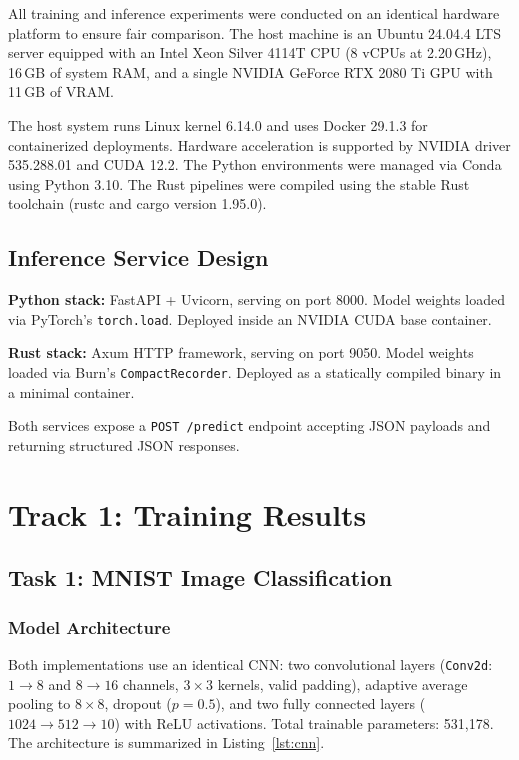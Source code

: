 \documentclass{ieeeaccess}
\begin{document}
All training and inference experiments were conducted on an identical hardware platform to ensure fair comparison. The host machine is an Ubuntu 24.04.4 LTS server equipped with an Intel Xeon Silver 4114T CPU (8 vCPUs at 2.20\,GHz), 16\,GB of system RAM, and a single NVIDIA GeForce RTX 2080 Ti GPU with 11\,GB of VRAM.

The host system runs Linux kernel 6.14.0 and uses Docker 29.1.3 for containerized deployments. Hardware acceleration is supported by NVIDIA driver 535.288.01 and CUDA 12.2. The Python environments were managed via Conda using Python 3.10. The Rust pipelines were compiled using the stable Rust toolchain (rustc and cargo version 1.95.0).

\subsection{Inference Service Design}

\textbf{Python stack:} FastAPI + Uvicorn, serving on port 8000. Model weights loaded via PyTorch's \texttt{torch.load}. Deployed inside an NVIDIA CUDA base container.

\textbf{Rust stack:} Axum HTTP framework, serving on port 9050. Model weights loaded via Burn's \texttt{CompactRecorder}. Deployed as a statically compiled binary in a minimal container.

Both services expose a \texttt{POST /predict} endpoint accepting JSON payloads and returning structured JSON responses.

\section{Track 1: Training Results}
\label{sec:track1}

\subsection{Task 1: MNIST Image Classification}

\subsubsection{Model Architecture}

Both implementations use an identical CNN: two convolutional layers (\texttt{Conv2d}: $1{\to}8$ and $8{\to}16$ channels, $3{\times}3$ kernels, valid padding), adaptive average pooling to $8{\times}8$, dropout ($p=0.5$), and two fully connected layers ($1024{\to}512{\to}10$) with ReLU activations. Total trainable parameters: 531,178. The architecture is summarized in Listing~\ref{lst:cnn}.
\end{document}
